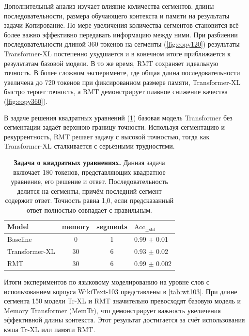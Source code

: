 Дополнительный анализ изучает влияние количества сегментов, длины последовательности, размера обучающего контекста и памяти на результаты задачи Копирование. По мере увеличения количества сегментов становится всё более важно эффективно передавать информацию между ними. При разбиении последовательности длиной 360 токенов на сегменты (\cref{fig:copy120}) результаты Transformer-XL постепенно ухудшается и в конечном итоге приближается к результатам базовой модели. В то же время, RMT сохраняет идеальную точность. В более сложном эксперименте, где общая длина последовательности увеличена до 720 токенов при фиксированном размере памяти, Transformer-XL быстро теряет точность, а RMT демонстрирует плавное снижение качества (\cref{fig:copy360}).

В задаче решения квадратных уравнений (\cref{tab:quadratic_eq}) базовая модель Transformer без сегментации задаёт верхнюю границу точности. Используя сегментацию и рекуррентность, RMT решает задачу с высокой точностью, тогда как Transformer-XL сталкивается с серьёзными трудностями. 


\begin{table}%
    \centering
    \begin{tabular}{lccl}
    \toprule
    Model          & memory & segments & $\text{Acc}_{\pm \text{std}}$ \\
    \midrule
    Baseline        &  0           &  1          & 0.99 \tiny{$\pm$ 0.01} \\
    Transformer-XL           &  30          &  6          & 0.93 \tiny{$\pm$ 0.02} \\
    RMT             &  30          &  6          & 0.99 \tiny{$\pm$ 0.002} \\
    \bottomrule
    \end{tabular}

\caption{\textbf{Задача о квадратных уравнениях.} Данная задача включает 180 токенов, представляющих квадратное уравнение, его решение и ответ. Последовательность делится на сегменты, причём последний сегмент содержит ответ. Точность равна 1,0, если предсказанный ответ полностью совпадает с правильным.} 
\label{tab:quadratic_eq} 
\end{table}

Итоги экспериментов по языковому моделированию на уровне слов с использованием корпуса WikiText-103 представлены в \cref{tab:wt103}. При длине сегмента 150 модели Tr-XL и RMT значительно превосходят базовую модель и Memory Transformer (MemTr), что демонстрирует важность увеличения эффективной длины контекста. Этот результат достигается за счёт использования кэша Tr-XL или памяти RMT.

